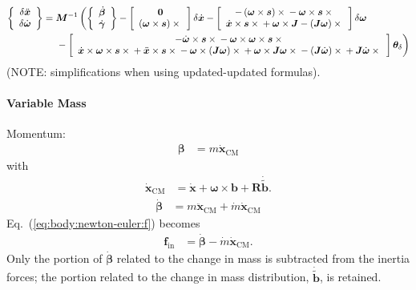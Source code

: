 \documentclass[10pt,dvips,fleqn,subeqn]{report}
\newcommand{\T}[1]{\bm{#1}}
\newcommand{\TT}[1]{\bm{#1}}
\begin{document}
\begin{align}
	\cubr{\cvvect{
		\delta\ddot{\T{x}}
		\\
		\delta\dot{\T{\omega}}
	}}
	&=
	\TT{M}^{-1} \lplbr{
		\cubr{\cvvect{
			\dot{\T{\beta}}
			\\
			\dot{\T{\gamma}}
		}}
		-
		\sqbr{\cvvect{
			\T{0}
			\\
			\plbr{\T{\omega} \times \T{s}}\times{}
		}} \delta\dot{\T{x}}
		-
		\sqbr{\cvvect{
			- \plbr{\T{\omega} \times \T{s}} \times{}
			- \T{\omega} \times \T{s} \times{}
			\\
			\dot{\T{x}} \times \T{s} \times{}
			+
			\T{\omega} \times \TT{J}
			-
			\plbr{\TT{J} \T{\omega}} \times {}
		}} \delta\T{\omega}
	}
	\nonumber \\ &\rplbr{\mbox{\hphantom{= }}
		- \sqbr{\cvvect{
			-\dot{\T{\omega}} \times \T{s} \times{}
			- \T{\omega} \times \T{\omega} \times \T{s} \times{}
			\\
			\dot{\T{x}} \times \T{\omega} \times \T{s} \times{}
			+
			\ddot{\T{x}} \times \T{s} \times{}
			-
			\T{\omega} \times \plbr{\TT{J} \T{\omega}} \times{}
			+
			\T{\omega} \times \T{J} \T{\omega} \times{}
			-
			\plbr{\TT{J} \dot{\T{\omega}}} \times{}
			+
			\TT{J} \dot{\T{\omega}} \times{}
		}}\T{\theta}_{\delta}
	}
\end{align}
(NOTE: simplifications when using updated-updated formulas).



\paragraph{Variable Mass}
Momentum:
\begin{align}
	\T{\beta}
	&=
	m \dot{\T{x}}_\text{CM}
\end{align}
with
\begin{align}
	\dot{\T{x}}_\text{CM}
	&=
	\dot{\T{x}}
	+
	\T{\omega} \times \T{b}
	+
	\TT{R} \dot{\tilde{\T{b}}}
	.
\end{align}
\begin{align}
	\dot{\T{\beta}}
	&=
	m \ddot{\T{x}}_\text{CM}
	+
	\dot{m} \dot{\T{x}}_\text{CM}
\end{align}
Eq.~(\ref{eq:body:newton-euler:f}) becomes
\begin{align}
	\T{f}_\text{in}
	&=
	\dot{\T{\beta}}
	-
	\dot{m} \dot{\T{x}}_\text{CM}
	.
\end{align}
Only the portion of $\dot{\T{\beta}}$ related to the change in mass
is subtracted from the inertia forces; the portion related
to the change in mass distribution, $\dot{\tilde{\T{b}}}$, is retained.
\end{document}
